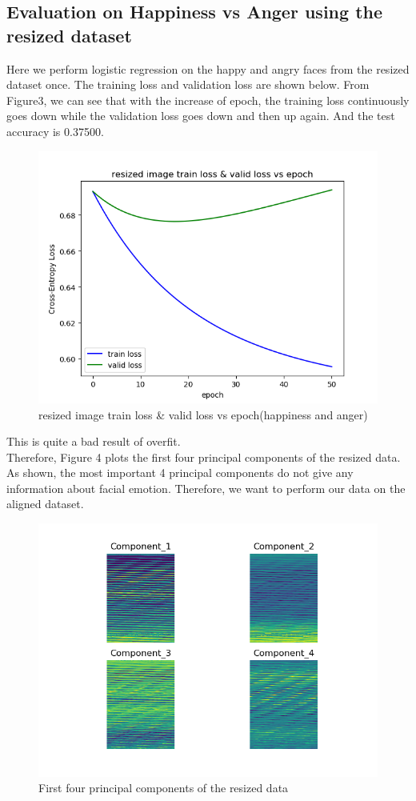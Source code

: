 \documentclass{article} %
\begin{document}
\subsection {Evaluation on Happiness vs Anger using the resized dataset}
Here we perform logistic regression on the happy and angry faces from the resized dataset once. The training loss and validation loss are shown below.
From Figure3, we can see that with the increase of epoch, the training loss continuously goes down while the validation loss goes down and then up again. And the test accuracy is 0.37500.
\begin{figure}[htb]
	\centering
	\includegraphics[scale=0.5]{./graph/resized_tvloss.png}
	\caption{resized image train loss \& valid loss vs epoch(happiness and anger)}
\end{figure} 
This is quite a bad result of overfit. \\
Therefore, Figure 4 plots the first four principal components of the resized data. As shown, the most important 4 principal components do not give any information about facial emotion. Therefore, we want to perform our data on the aligned dataset.
\begin{figure}[h]
	\centering
	\includegraphics[scale=0.5]{./graph/pca_resized.png}
	\caption{First four principal components of the resized data}
\end{figure} 
\end{document}
